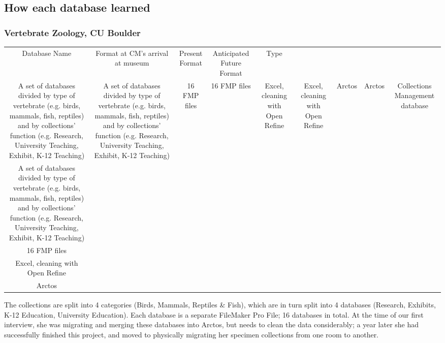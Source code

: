 \subsection{How each database learned}

\subsubsection{Vertebrate Zoology, CU Boulder}
\begin{tabular}{ c c c c c c c c c }
    Database Name & Format at CM's arrival at museum & Present Format & Anticipated Future Format & Type \\ 
    A set of
  databases divided by type of vertebrate (e.g. birds, mammals, fish, reptiles)
  and by collections' function (e.g. Research, University Teaching, Exhibit,
  K-12 Teaching) & A set of
  databases divided by type of vertebrate (e.g. birds, mammals, fish, reptiles)
  and by collections' function (e.g. Research, University Teaching, Exhibit,
  K-12 Teaching) & 16 FMP
  files & 16 FMP
  files & Excel,
  cleaning with Open Refine & Excel,
  cleaning with Open Refine & Arctos & Arctos & Collections Management database \\ 
    A set of
  databases divided by type of vertebrate (e.g. birds, mammals, fish, reptiles)
  and by collections' function (e.g. Research, University Teaching, Exhibit,
  K-12 Teaching) \\ 
    16 FMP
  files \\ 
    Excel,
  cleaning with Open Refine \\ 
    Arctos \\ 
\end{tabular}



The collections are split into 4 categories (Birds, Mammals, Reptiles & Fish), which are in turn split into 4 databases (Research, Exhibits, K-12 Education, University Education). Each database is a separate FileMaker Pro File; 16 databases in total.  At the time of our first interview, she was migrating and merging these databases into Arctos, but needs to clean the data considerably; a year later she had successfully finished this project, and moved to physically migrating her specimen collections from one room to another.

